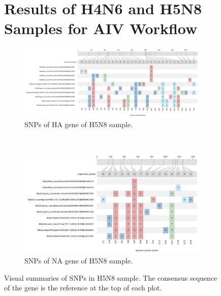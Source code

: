\begin{figure}
	\section*{\thesection \quad Results of H4N6 and H5N8 Samples for AIV Workflow}
	\centering
	\begin{subfigure}[b]{1.1\textwidth}
		\hspace*{-50pt}
		\includegraphics[width=1.0\textwidth]{media/4-aiv-snipit-s8-4-ha.png}
		\caption{SNPs of HA gene of H5N8 sample.}
		\label{fig:apx-aiv-snipit-s8-ha}
	\end{subfigure}
	\\
	\vspace*{20pt}
	\begin{subfigure}[b]{1.0\textwidth}
		\hspace*{-40pt}
		\includegraphics[width=1.0\textwidth]{media/4-aiv-snipit-s8-6-na.png}
	\caption{SNPs of NA gene of H5N8 sample.}
	\label{fig:apx-aiv-snipit-s8-na}
	\end{subfigure}
	\caption[Visual summaries of SNPs in H5N8 sample.]{Visual summaries of SNPs in H5N8 sample. The consensus sequence of the gene is the reference at the top of each plot.}
\label{fig:apx-aiv-snipit-s8}
\end{figure}

